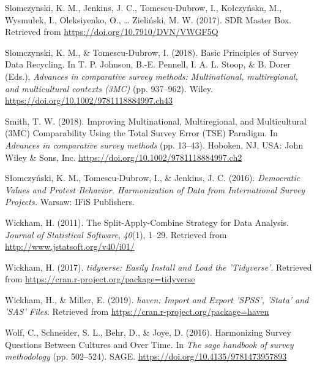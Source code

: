 \documentclass[12pt,]{article}
\begin{document}
\leavevmode\hypertarget{ref-Slomczynskietal2017}{}%
Slomczynski, K. M., Jenkins, J. C., Tomescu-Dubrow, I., Kołczyńska, M., Wysmułek, I., Oleksiyenko, O., \ldots{} Zieliński, M. W. (2017). SDR Master Box. Retrieved from \url{https://doi.org/10.7910/DVN/VWGF5Q}

\leavevmode\hypertarget{ref-Slomczynski2018}{}%
Slomczynski, K. M., \& Tomescu-Dubrow, I. (2018). Basic Principles of Survey Data Recycling. In T. P. Johnson, B.-E. Pennell, I. A. L. Stoop, \& B. Dorer (Eds.), \emph{Advances in comparative survey methods: Multinational, multiregional, and multicultural contexts (3MC)} (pp. 937--962). Wiley. \url{https://doi.org/10.1002/9781118884997.ch43}

\leavevmode\hypertarget{ref-Smith2018}{}%
Smith, T. W. (2018). Improving Multinational, Multiregional, and Multicultural (3MC) Comparability Using the Total Survey Error (TSE) Paradigm. In \emph{Advances in comparative survey methods} (pp. 13--43). Hoboken, NJ, USA: John Wiley \& Sons, Inc. \url{https://doi.org/10.1002/9781118884997.ch2}

\leavevmode\hypertarget{ref-Slomczynskietal2016}{}%
Słomczyński, K. M., Tomescu-Dubrow, I., \& Jenkins, J. C. (2016). \emph{Democratic Values and Protest Behavior. Harmonization of Data from International Survey Projects.} Warsaw: IFiS Publishers.

\leavevmode\hypertarget{ref-Wickham2011}{}%
Wickham, H. (2011). The Split-Apply-Combine Strategy for Data Analysis. \emph{Journal of Statistical Software}, \emph{40}(1), 1--29. Retrieved from \url{http://www.jstatsoft.org/v40/i01/}

\leavevmode\hypertarget{ref-tidyverse}{}%
Wickham, H. (2017). \emph{tidyverse: Easily Install and Load the 'Tidyverse'}. Retrieved from \url{https://cran.r-project.org/package=tidyverse}

\leavevmode\hypertarget{ref-haven}{}%
Wickham, H., \& Miller, E. (2019). \emph{haven: Import and Export 'SPSS', 'Stata' and 'SAS' Files}. Retrieved from \url{https://cran.r-project.org/package=haven}

\leavevmode\hypertarget{ref-Wolf2016}{}%
Wolf, C., Schneider, S. L., Behr, D., \& Joye, D. (2016). Harmonizing Survey Questions Between Cultures and Over Time. In \emph{The sage handbook of survey methodology} (pp. 502--524). SAGE. \url{https://doi.org/10.4135/9781473957893}
\end{document}
